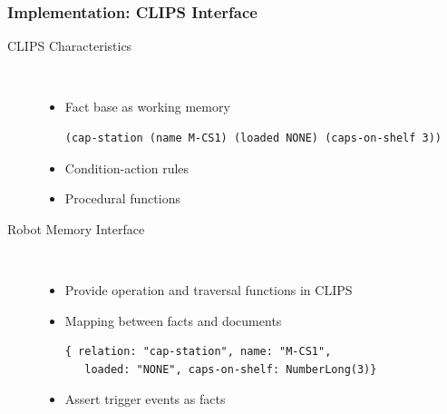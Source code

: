 \begin{frame}[fragile]
  \frametitle{Implementation: CLIPS Interface}
  \begin{description}
  \item[CLIPS Characteristics]%
                \hfill \\
    \begin{itemize}
    \item Fact base as working memory
  \begin{lstlisting}[showlines,style=ReallySmallCLIPS,
  framexleftmargin=4pt, xleftmargin=0pt,
  emph={skill, args, state, target, res},
  emphstyle=\bfseries\color{green!80!black},
  emph={[2]\?skill, \$\?args, cap-station, \?target, use,
  WAIT-FOR-LOCK, SKILL-EXECUTION, running},
  emphstyle={[2]\bfseries\color{blue!80!black}},
  morekeywords={retract, assert, modify, skill-call, skill-to-execute,
    wait-for-lock},
  numbers=none]
(cap-station (name M-CS1) (loaded NONE) (caps-on-shelf 3))
\end{lstlisting} %
    \item Condition-action rules
    \item Procedural functions
    \end{itemize}
  \item[Robot Memory Interface]%
                \hfill \\
    \begin{itemize}
    \item Provide operation and traversal functions in CLIPS %
    \item Mapping between facts and documents
\begin{lstlisting}[style=SmallJSON,
  framexleftmargin=0pt, xleftmargin=0pt,
 morekeywords={}, numbers=none]
 { relation: "cap-station", name: "M-CS1",
   loaded: "NONE", caps-on-shelf: NumberLong(3)}
\end{lstlisting}
    \item Assert trigger events as facts
    \end{itemize}
  \end{description}
\end{frame}

